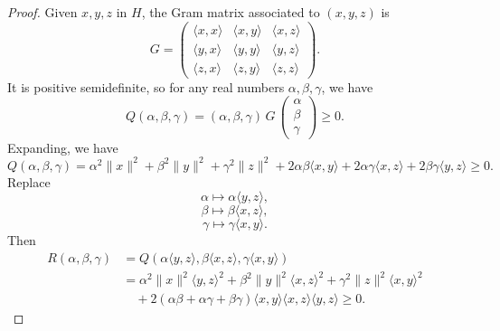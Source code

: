 \documentclass[10pt,a4paper]{amsart}
\begin{document}
\begin{proof}
Given \(x, y, z\) in $H$, the Gram matrix associated to $(x,y,z)$ is  
\[
G = \begin{pmatrix}
\langle x, x \rangle & \langle x, y \rangle & \langle x, z \rangle \\
\langle y, x \rangle & \langle y, y \rangle & \langle y, z \rangle \\
\langle z, x \rangle & \langle z, y \rangle & \langle z, z \rangle
\end{pmatrix}.
\]
It is positive semidefinite, so for any real numbers \(\alpha, \beta, \gamma\), we have  
\[
Q(\alpha, \beta, \gamma) = (\alpha, \beta, \gamma) \, G \, \begin{pmatrix} \alpha \\ \beta \\ \gamma \end{pmatrix} \ge 0.
\]
Expanding, we have
\[
Q(\alpha, \beta, \gamma) =
\alpha^2 \|x\|^2 + \beta^2 \|y\|^2 + \gamma^2 \|z\|^2
+ 2\alpha\beta\langle x, y\rangle + 2\alpha\gamma\langle x, z\rangle + 2\beta\gamma\langle y, z\rangle \geq 0.
\]
Replace
\[
\alpha \mapsto \alpha \langle y, z \rangle,
\]
\[
\beta \mapsto \beta \langle x, z \rangle,
\]
\[
\gamma \mapsto \gamma \langle x, y \rangle.
\]
Then
\begin{align*}
R(\alpha,\beta,\gamma) &= Q(\alpha \langle y, z \rangle, \beta \langle x, z \rangle , \gamma  \langle x, y \rangle) \\
&=  \alpha^2  \|x\|^2 \langle y, z \rangle^2 + \beta^2 \|y\|^2 \langle x, z \rangle^2 + \gamma^2 \|z\|^2 \langle x, y \rangle^2  \\
&\quad + 2  (\alpha\beta + \alpha\gamma + \beta\gamma) \langle x, y\rangle \langle x, z\rangle \langle y, z\rangle \geq 0.
\end{align*}
\end{proof}
\end{document}
